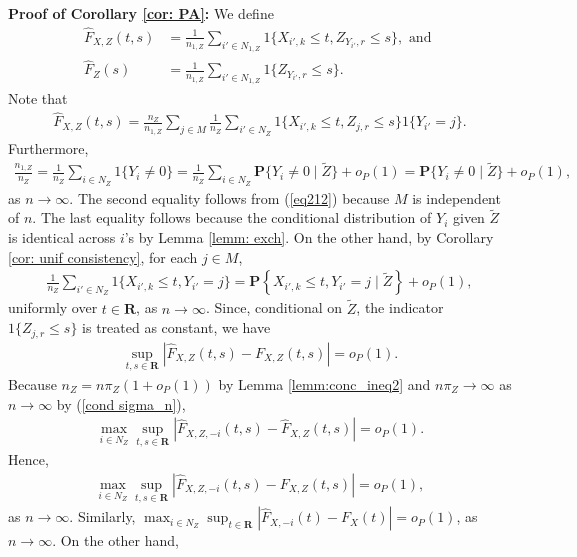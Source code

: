 \documentclass[12pt, fullpage]{amsart}
\theoremstyle{definition}
\theoremstyle{definition}
\theoremstyle{definition}
\begin{document}
\begin{bibunit}[econometrica]
\noindent \textbf{Proof of Corollary \ref{cor: PA}: } We define
\begin{align*}
	\hat F_{X,Z}(t,s) &= \frac{1}{n_{1,Z}}\sum_{i' \in N_{1,Z}} 1\{X_{i',k} \le t, Z_{Y_{i'},r} \le s\}, \text{ and } \\
	\hat F_{Z}(s) &= \frac{1}{n_{1,Z}}\sum_{i' \in N_{1,Z}} 1\{Z_{Y_{i'},r} \le s\}.
\end{align*}
Note that
\begin{align*}
	\hat F_{X,Z}(t,s) = \frac{n_Z}{n_{1,Z}} \sum_{j \in M} \frac{1}{n_Z}\sum_{i' \in N_Z} 1\{X_{i',k} \le t, Z_{j,r} \le s\}1\{Y_{i'} = j\}.
\end{align*}
Furthermore,
\begin{align}
	\label{conv2}
	\frac{n_{1,Z}}{n_Z} = \frac{1}{n_Z}\sum_{i \in N_Z} 1\{Y_i \ne 0\} =  \frac{1}{n_Z}\sum_{i \in N_Z} \mathbf{P}\{Y_i \ne 0 \mid \tilde Z\} + o_P(1) = \mathbf{P}\{Y_i \ne 0 \mid \tilde Z\} + o_P(1),
\end{align}
as $n \rightarrow \infty$. The second equality follows from (\ref{eq212}) because $M$ is independent of $n$. The last equality follows because the conditional distribution of $Y_i$ given $\tilde Z$ is identical across $i$'s by Lemma \ref{lemm: exch}. On the other hand, by Corollary \ref{cor: unif consistency}, for each $j \in M$,
\begin{align*}
	\frac{1}{n_Z}\sum_{i' \in N_Z} 1\{X_{i',k} \le t, Y_{i'} = j\} = \mathbf{P}\left\{X_{i',k} \le t, Y_{i'} = j \mid \tilde Z \right\} + o_P(1),
\end{align*}
uniformly over $t \in \mathbf{R}$, as $n \rightarrow \infty$. Since, conditional on $\tilde Z$, the indicator $1\{Z_{j,r} \le s\}$ is treated as constant, we have
\begin{align*}
	\sup_{t,s \in \mathbf{R}}\left|\hat F_{X,Z}(t,s) - F_{X,Z}(t,s) \right| = o_P(1).
\end{align*}
Because $n_Z = n\pi_Z (1 + o_P(1))$ by Lemma \ref{lemm:conc_ineq2} and $n\pi_Z \rightarrow \infty$ as $n \rightarrow \infty$ by (\ref{cond sigma_n}), 
\begin{align*}
	\max_{i \in N_Z} \sup_{t,s \in \mathbf{R}}\left|\hat F_{X,Z,-i}(t,s)  - \hat F_{X,Z}(t,s)\right| = o_P(1).
\end{align*}
Hence,
\begin{align*}
	\max_{i \in N_Z} \sup_{t,s \in \mathbf{R}}\left|\hat F_{X,Z,-i}(t,s)  - F_{X,Z}(t,s)\right| = o_P(1),
\end{align*}
as $n \rightarrow \infty$. Similarly, $\max_{ i \in N_Z} \sup_{t \in \mathbf{R}}\left|\hat F_{X,-i}(t)  - F_{X}(t)\right| = o_P(1)$, as $n \rightarrow \infty$. On the other hand,

\end{bibunit}
\end{document}
